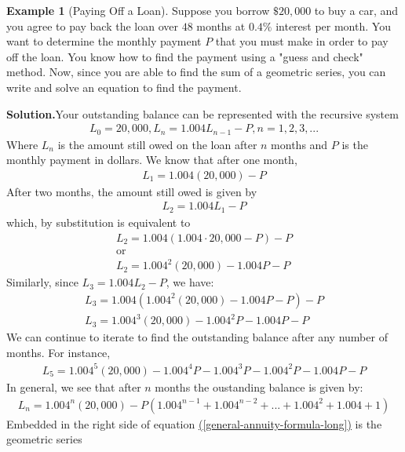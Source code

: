 \documentclass[10pt,]{book}
\theoremstyle{plain}
\theoremstyle{definition}
\theoremstyle{definition}
\newtheorem{example}[theorem]{Example}
\theoremstyle{definition}
\numberwithin{equation}{section}
\begin{document}
\begin{example}[Paying Off a Loan]\label{example-12}
Suppose you borrow \(\$20,000\) to buy a car, and you agree to pay back the loan over \(48\) months at \(0.4 \%\) interest per month.  You want to determine the monthly payment \(P\) that you must make in order to pay off the loan. You know how to find the payment using a "guess and check" method.  Now, since you are able to find the sum of a geometric series, you can write and solve an equation to find the payment.%
\par\medskip\noindent%
\textbf{Solution.}\quad Your outstanding balance can be represented with the recursive system%
%
\begin{gather*}
L_0=20,000, L_n=1.004L_{n-1}-P, n=1,2,3,...
\end{gather*}
Where \(L_n\) is the amount still owed on the loan after \(n\) months and \(P\) is the monthly payment in dollars.  We know that after one month,%
%
\begin{gather*}
L_1=1.004(20,000)-P
\end{gather*}
After two months, the amount still owed is given by%
%
\begin{gather*}
L_2 = 1.004L_1-P
\end{gather*}
which, by substitution is equivalent to%
%
\begin{gather*}
L_2=1.004(1.004 \cdot 20,000 - P) - P\\
\text{or}\\
L_2=1.004^2(20,000)-1.004P-P
\end{gather*}
Similarly, since \(L_3=1.004L_2-P\), we have:%
%
\begin{gather*}
L_3=1.004(1.004^2 (20,000) - 1.004P - P) - P\\
L_3=1.004^3(20,000) - 1.004^2P - 1.004P - P
\end{gather*}
We can continue to iterate to find the outstanding balance after any number of months. For instance,%
%
\begin{gather*}
L_5=1.004^5 (20,000)-1.004^4 P-1.004^3 P-1.004^2 P-1.004P-P
\end{gather*}
In general, we see that after \(n\) months the oustanding balance is given by:%
%
\begin{gather}
L_n=1.004^n (20,000) - P( 1.004^{n-1} + 1.004^{n-2} + ... + 1.004^2 + 1.004 + 1 )\label{general-annuity-formula-long}
\end{gather}
Embedded in the right side of equation \hyperref[general-annuity-formula-long]{(\ref{general-annuity-formula-long})} is the geometric series%

\end{example}
\end{document}
